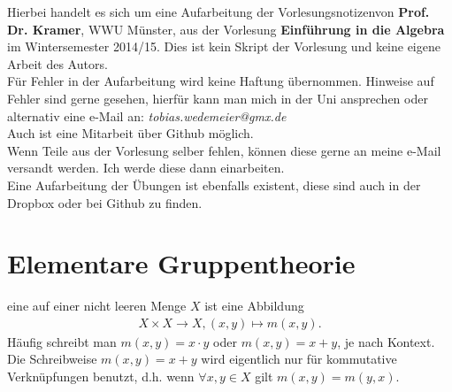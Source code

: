 

\newcommand{\vorlesung}{Einführung in die Algebra}
\newcommand{\Prof}{Prof. Dr. Kramer}
\newcommand{\subt}{Aufarbeitung der Vorlesungsnotizen}





\maketitle
\thispagestyle{empty}
\newpage

\thispagestyle{empty}
\vspace*{\fill}
\begin{center}
	Hierbei handelt es sich um eine \subt von \textbf{\Prof}, WWU Münster, aus der Vorlesung \textbf{\vorlesung} im Wintersemester 2014/15. Dies ist kein Skript der Vorlesung und keine eigene Arbeit des Autors.\\
	\vspace{2cm}
	Für Fehler in der Aufarbeitung wird keine Haftung übernommen. Hinweise auf Fehler sind gerne gesehen, hierfür kann man mich in der Uni ansprechen oder alternativ eine e-Mail an: \textit{tobias.wedemeier@gmx.de}\\
	Auch ist eine Mitarbeit über Github möglich.\\
	\vspace{2cm}
	Wenn Teile aus der Vorlesung selber fehlen, können diese gerne an meine e-Mail versandt werden. Ich werde diese dann einarbeiten.\\
	\vspace{2cm}
	Eine Aufarbeitung der Übungen ist ebenfalls existent, diese sind auch in der Dropbox oder bei Github zu finden.
\end{center}
\vspace*{\fill}
\newpage


\tableofcontents
\cleardoubleoddemptypage %

\setcounter{page}{1}

\section{Elementare Gruppentheorie}
\label{sec:elementare_gruppentheorie}

 eine  auf einer nicht leeren Menge $X$ ist eine Abbildung
\begin{equation*}
\begin{aligned}
X\times X \to X , (x,y) \mapsto m(x,y).
\end{aligned}
\end{equation*}
Häufig schreibt man $m(x,y)= x\cdot y$ oder $ m(x,y) = x + y$, je nach Kontext. Die Schreibweise $m(x,y)=x+y$ wird eigentlich nur für kommutative Verknüpfungen benutzt, d.h. wenn $\forall x,y\in X$ gilt $m(x,y)=m(y,x)$.

